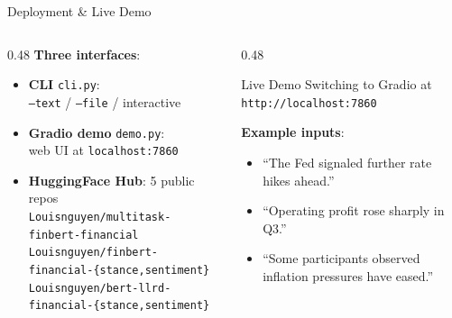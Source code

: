 \documentclass[10pt, aspectratio=169]{beamer}
\begin{document}
\begin{frame}{Deployment \& Live Demo}
    \begin{columns}[T]
        \begin{column}{0.48\textwidth}
            \textbf{Three interfaces}:
            \begin{itemize}\setlength{\itemsep}{3pt}
                \item \textbf{CLI} \texttt{cli.py}:\\
                      {\small \texttt{--text} / \texttt{--file} / interactive}
                \item \textbf{Gradio demo} \texttt{demo.py}:\\
                      {\small web UI at \texttt{localhost:7860}}
                \item \textbf{HuggingFace Hub}: 5 public repos\\
                      {\scriptsize
                      \texttt{Louisnguyen/\allowbreak multitask-finbert-financial}\\
                      \texttt{Louisnguyen/\allowbreak finbert-financial-\{stance,sentiment\}}\\
                      \texttt{Louisnguyen/\allowbreak bert-llrd-financial-\{stance,sentiment\}}}
            \end{itemize}
        \end{column}
        \begin{column}{0.48\textwidth}
            \centering
            \begin{block}{\centering Live Demo}
                \centering
                \vspace{0.3em}
                Switching to Gradio at \texttt{http://localhost:7860}
                \vspace{0.3em}
            \end{block}
            \vspace{0.5em}
            \textbf{Example inputs}:
            \begin{itemize}\setlength{\itemsep}{1pt}
                \item ``The Fed signaled further rate hikes ahead.''
                \item ``Operating profit rose sharply in Q3.''
                \item ``Some participants observed inflation pressures have eased.''
            \end{itemize}
        \end{column}
    \end{columns}
\end{frame}
\end{document}
